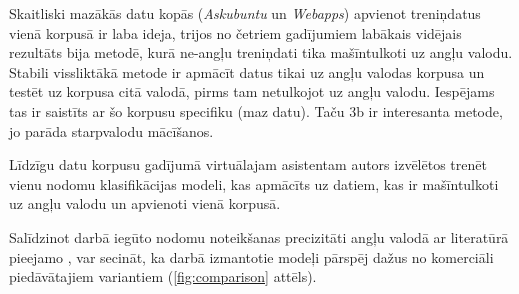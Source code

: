 Skaitliski mazākās datu kopās (\textit{Askubuntu} un \textit{Webapps}) apvienot treniņdatus vienā korpusā ir laba ideja, trijos no četriem gadījumiem labākais vidējais rezultāts bija metodē, kurā ne-angļu treniņdati tika mašīntulkoti uz angļu valodu. Stabili vissliktākā metode ir apmācīt datus tikai uz angļu valodas korpusa un testēt uz korpusa citā valodā, pirms tam netulkojot uz angļu valodu. Iespējams tas ir saistīts ar šo korpusu specifiku (maz datu). Taču 3b ir interesanta metode, jo parāda starpvalodu mācīšanos. 

Līdzīgu datu korpusu gadījumā virtuālajam asistentam autors izvēlētos trenēt vienu nodomu klasifikācijas modeli, kas apmācīts uz datiem, kas ir mašīntulkoti uz angļu valodu un apvienoti vienā korpusā.


Salīdzinot darbā iegūto nodomu noteikšanas precizitāti angļu valodā ar literatūrā pieejamo \cite{fasttext2019}, var secināt, ka darbā izmantotie modeļi pārspēj dažus no komerciāli piedāvātajiem variantiem (\ref{fig:comparison} attēls).







